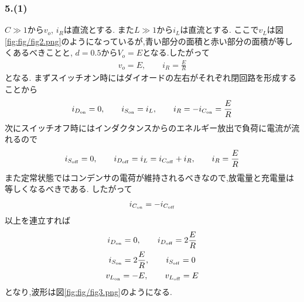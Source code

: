 \subsubsection*{5.(1)}
$C\gg1$から$v_o$, $i_R$は直流とする.
また$L\gg1$から$i_L$は直流とする.
ここで$v_L$は図\ref{fig:fig/fig2.png}のようになっているが,青い部分の面積と赤い部分の面積が等しくあるべきことと,
$d=0.5$から$V_o=E$となる.したがって
\begin{align*}
  v_o=E,\qquad i_R=\frac{E}{R}
\end{align*}
となる.
まずスイッチオン時にはダイオードの左右がそれぞれ閉回路を形成することから
\begin{align*}
  i_{D_{\rm on}}=0,\qquad i_{S_{\rm on}}=i_L,\qquad i_R=-i_{C_{\rm on}}=\frac{E}{R}
\end{align*}
次にスイッチオフ時にはインダクタンスからのエネルギー放出で負荷に電流が流れるので
\begin{align*}
  i_{S_{\rm off}}=0,\qquad i_{D_{\rm off}}=i_L=i_{C_{\rm off}}+i_R,\qquad i_R=\frac{E}{R}
\end{align*}
また定常状態ではコンデンサの電荷が維持されるべきなので,放電量と充電量は等しくなるべきである.
したがって
\begin{align*}
  i_{C_{\rm on}}=-i_{C_{\rm off}}
\end{align*}
以上を連立すれば
\begin{gather*}
  i_{D_{\rm on}}=0,\qquad i_{D_{\rm off}}=2\frac{E}{R}\\
  i_{S_{\rm on}}=2\frac{E}{R},\qquad i_{S_{\rm off}}=0\\
  v_{L_{\rm on}}=-E,\qquad v_{L_{\rm off}}=E
\end{gather*}
となり,波形は図\ref{fig:fig/fig3.png}のようになる.
